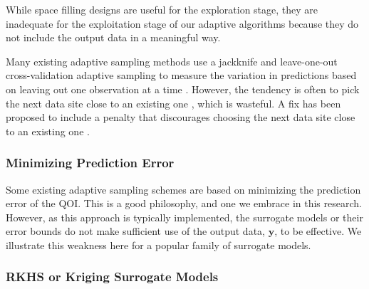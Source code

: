 \documentclass[11pt]{NSFamsart}
\newcommand{\by}{{\boldsymbol{y}}}
\begin{document}
While space filling designs are useful for the exploration stage, they are inadequate for the exploitation stage of our adaptive algorithms because they do not include the output data in a meaningful way.  


Many existing adaptive sampling methods use a jackknife and leave-one-out cross-validation adaptive sampling to measure the variation in predictions based on leaving out one observation at a time \cite{aute2013cross,jin2002sequential, kleijnen2004application}.  However, the tendency is often to pick the next data site close to an existing one \cite{jin2002sequential}, which is wasteful.  A fix has been proposed to include a penalty that discourages choosing the next data site close to an existing one \cite{aute2013cross,jin2002sequential}.


\subsubsection{Minimizing Prediction Error} \label{sec:MinPredErr}

Some existing adaptive sampling schemes are based on minimizing the prediction error of the QOI.  This is a good philosophy, and one we embrace in this research.  However, as this approach is typically implemented, the surrogate models or their error bounds do not make sufficient use of the output data, $\by$, to be effective.   We illustrate this weakness here for a popular family of surrogate models.

\iffalse
\subsubsection{RKHS or Kriging Surrogate Models} \label{sec:RKHSKrigSurrModel}
\end{document}

